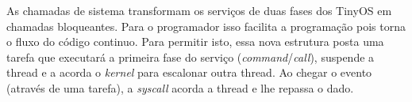 As chamadas de sistema transformam os serviços de duas fases dos TinyOS em chamadas bloqueantes. Para o programador isso
facilita a programação pois torna o fluxo do código continuo. Para permitir isto, essa nova estrutura posta uma tarefa
que executará a primeira fase do serviço (\textit{command}/\textit{call}), suspende a thread e a acorda o
\textit{kernel} para escalonar outra thread. Ao chegar o evento (através de uma tarefa), a \textit{syscall} acorda a thread e lhe repassa o dado.
